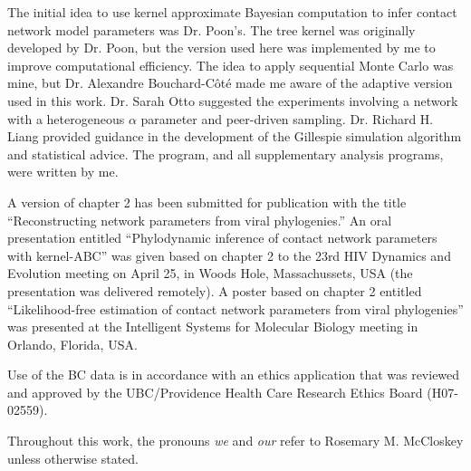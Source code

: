 The initial idea to use kernel approximate Bayesian computation to infer
contact network model parameters was Dr. Poon's. The tree kernel was originally
developed by Dr. Poon, but the version used here was implemented by me to
improve computational efficiency. The idea to apply sequential Monte Carlo was
mine, but Dr. Alexandre Bouchard-C\^ot\'e made me aware of the adaptive version
used in this work. Dr. Sarah Otto suggested the experiments involving a network
with a heterogeneous $\alpha$ parameter and peer-driven sampling. Dr. Richard
H. Liang provided guidance in the development of the Gillespie simulation
algorithm and statistical advice. The  program, and all
supplementary analysis programs, were written by me.

A version of chapter 2 has been submitted for publication with the title
``Reconstructing network parameters from viral phylogenies.'' An oral
presentation entitled ``Phylodynamic inference of contact network parameters
with kernel-ABC'' was given based on chapter 2 to the 23rd HIV Dynamics and
Evolution meeting on April 25, in Woods Hole, Massachussets, USA (the
presentation was delivered remotely). A poster based on chapter 2 entitled
``Likelihood-free estimation of contact network parameters from viral
phylogenies'' was presented at the Intelligent Systems for Molecular Biology
meeting in Orlando, Florida, USA.

Use of the BC data is in accordance with an ethics application that was
reviewed and approved by the UBC/Providence Health Care Research Ethics Board
(H07-02559).

Throughout this work, the pronouns \textit{we} and \textit{our} refer to
Rosemary M. McCloskey unless otherwise stated.

